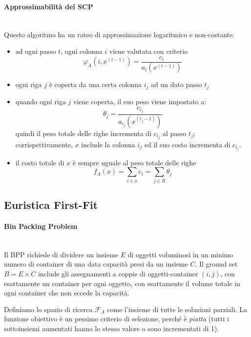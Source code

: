 \documentclass{article}
\begin{document}
\paragraph{Approssimabilità del SCP}\mbox{}\\
Questo algoritmo ha un rateo di approssimazione logaritmico e non-costante.
\begin{itemize}
    \item ad ogni passo $t$, ogni colonna $i$ viene valutata con criterio
          $$\varphi_A(i,x^{(t-1)})=\frac{c_i}{a_i(x^{(t-1)})}$$
    \item ogni riga $j$ è coperta da una certa colonna $i_j$ ad un dato passo $t_j$
    \item quando ogni riga $j$ viene coperta, il suo peso viene impostato a:
          $$\theta_j=\frac{c_{i_j}}{a_{i_j}(x^{(t_j-1)})}$$
          quindi il peso totale delle righe incrementa di $c_{i_j}$ al passo $t_j$;
          corrispettivamente, $x$ include la colonna $i_j$ ed il suo costo incrementa
          di $c_{i_j}$.
    \item il costo totale di $x$ è sempre uguale al peso totale delle righe
          $$f_A(x)=\sum_{i\in x}c_i=\sum_{j\in R}\theta_j$$
\end{itemize}

\subsection{Euristica First-Fit}
\paragraph{Bin Packing Problem}\mbox{}\\
Il BPP richiede di dividere un insieme $E$ di oggetti voluminosi in un minimo
numero di container di una data capacità presi da un insieme $C$.
Il ground set $B=E\times C$ include gli assegnamenti a coppie di oggetti-container $(i,j)$,
con esattamente un container per ogni oggetto, con esattamente il volume totale in ogni container che non
eccede la capacità.

Definiamo lo spazio di ricerca $\mathcal{F}_A$ come l'insieme di tutte le soluzioni
parziali. La funzione obiettivo è un pessimo criterio di selezione, perché è \textit{piatta}
(tutti i sottoinsiemi aumentati hanno lo stesso valore o sono incrementati di 1).
\end{document}
